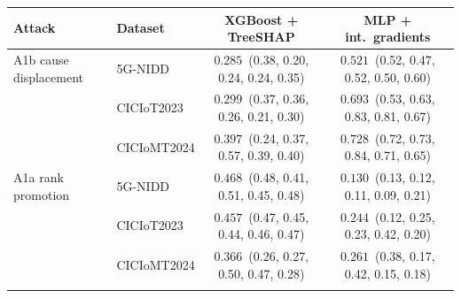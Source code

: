 \begin{tabular}{llcc}
\toprule
\textbf{Attack} & \textbf{Dataset} & \textbf{XGBoost + TreeSHAP} & \textbf{MLP + int.\ gradients} \\
\midrule
A1b cause displacement & 5G-NIDD & $0.285$ \,(0.38, 0.20, 0.24, 0.24, 0.35) & $0.521$ \,(0.52, 0.47, 0.52, 0.50, 0.60) \\
 & CICIoT2023 & $0.299$ \,(0.37, 0.36, 0.26, 0.21, 0.30) & $0.693$ \,(0.53, 0.63, 0.83, 0.81, 0.67) \\
 & CICIoMT2024 & $0.397$ \,(0.24, 0.37, 0.57, 0.39, 0.40) & $0.728$ \,(0.72, 0.73, 0.84, 0.71, 0.65) \\
\addlinespace
A1a rank promotion & 5G-NIDD & $0.468$ \,(0.48, 0.41, 0.51, 0.45, 0.48) & $0.130$ \,(0.13, 0.12, 0.11, 0.09, 0.21) \\
 & CICIoT2023 & $0.457$ \,(0.47, 0.45, 0.44, 0.46, 0.47) & $0.244$ \,(0.12, 0.25, 0.23, 0.42, 0.20) \\
 & CICIoMT2024 & $0.366$ \,(0.26, 0.27, 0.50, 0.47, 0.28) & $0.261$ \,(0.38, 0.17, 0.42, 0.15, 0.18) \\
\addlinespace
\bottomrule
\end{tabular}
